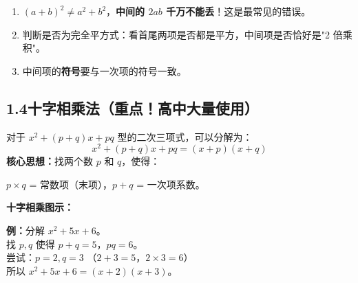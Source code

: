 \documentclass[12pt, a4paper]{ctexart}
\begin{document}
\begin{warnbox}[易错提醒]
\begin{enumerate}[leftmargin=18pt]
\item $(a+b)^2 \neq a^2+b^2$，\textbf{中间的 $2ab$ 千万不能丢}！这是最常见的错误。
\item 判断是否为完全平方式：看首尾两项是否都是平方，中间项是否恰好是"2 倍乘积"。
\item 中间项的\textbf{符号}要与一次项的符号一致。
\end{enumerate}
\end{warnbox}

\subsection*{1.4\quad 十字相乘法（重点！高中大量使用）}

\begin{knowledgebox}
对于 $x^2 + (p+q)x + pq$ 型的二次三项式，可以分解为：
\[
\boxed{x^2 + (p+q)x + pq = (x+p)(x+q)}
\]
\textbf{核心思想：}找两个数 $p$ 和 $q$，使得：\\
\begin{center}
$p \times q$ = 常数项（末项），\quad $p + q$ = 一次项系数。
\end{center}
\vspace{4pt}
\textbf{十字相乘图示：}\\[6pt]
\begin{center}
\end{center}
\vspace{4pt}
\textbf{例：}\quad 分解 $x^2 + 5x + 6$。\\
找 $p, q$ 使得 $p+q=5$，$pq=6$。\\
尝试：$p=2, q=3$ \checkmark\quad（$2+3=5$，$2\times3=6$）\\
所以 $x^2+5x+6=(x+2)(x+3)$。
\end{knowledgebox}
\end{document}

